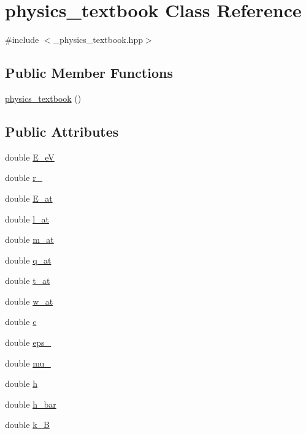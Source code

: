 \hypertarget{classphysics__textbook}{}\section{physics\+\_\+textbook Class Reference}
\label{classphysics__textbook}


{\ttfamily \#include $<$\+\_\+physics\+\_\+textbook.\+hpp$>$}

\subsection*{Public Member Functions}
\begin{DoxyCompactItemize}
\item 
\hyperlink{classphysics__textbook_a89b6993c2aecf444cd2fa540c73a110b}{physics\+\_\+textbook} ()
\end{DoxyCompactItemize}
\subsection*{Public Attributes}
\begin{DoxyCompactItemize}
\item 
double \hyperlink{classphysics__textbook_a73e078553f4f440e99aacad83f7df6d6}{E\+\_\+eV}
\item 
double \hyperlink{classphysics__textbook_ac429976f0dc885d846d8b31c24f45bd6}{r\+\_}
\item 
double \hyperlink{classphysics__textbook_aed1451ff3400dce39969e5ac319f033a}{E\+\_\+at}
\item 
double \hyperlink{classphysics__textbook_a4479790cea56c47a7db44d2d331c4cef}{l\+\_\+at}
\item 
double \hyperlink{classphysics__textbook_a6bb18bb140fbce54e2c73a7f2a72509f}{m\+\_\+at}
\item 
double \hyperlink{classphysics__textbook_aba33444d21762e4cbcfec165e6fd3ece}{q\+\_\+at}
\item 
double \hyperlink{classphysics__textbook_acdcf772ff70c544f8394b3a9fc57674c}{t\+\_\+at}
\item 
double \hyperlink{classphysics__textbook_a63250c79f053fa4aa1c8f3505971b4f1}{w\+\_\+at}
\item 
double \hyperlink{classphysics__textbook_a3c6dd19f14166d6c90d6f53aa4e31885}{c}
\item 
double \hyperlink{classphysics__textbook_a8ea9a65f207ec6ad3388e605f385454c}{eps\+\_}
\item 
double \hyperlink{classphysics__textbook_a300762c199172d9f76183b49db5f0f33}{mu\+\_}
\item 
double \hyperlink{classphysics__textbook_a416573e2d9fa6793711a69cdb291d824}{h}
\item 
double \hyperlink{classphysics__textbook_a5ec9850f0fa1b25180d8f6d1ed734848}{h\+\_\+bar}
\item 
double \hyperlink{classphysics__textbook_a666f84f0f7f65910169ed6b82129e5c8}{k\+\_\+B}
\end{DoxyCompactItemize}


